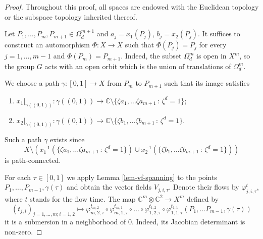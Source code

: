 \documentclass[a4paper,draft,reqno,12pt]{amsart}
\theoremstyle{definition}
\theoremstyle{remark}
\def\CC{{\mathbb C}}
\begin{document}
\begin{proof}
Throughout this proof, all spaces are endowed with the Euclidean topology or the subspace topology inherited thereof.

Let $P_1, \dots, P_m, P_{m+1} \in \Omega^{m+1}_d$ and $a_j = x_1(P_j)$, $b_j = x_2(P_j)$. It suffices to construct an automorphism $\Phi \colon X \to X$ such that $\Phi(P_j) = P_j$ for every 
$j =1, \dots, m-1$ and $\Phi(P_m) = P_{m+1}$. Indeed, the subset $\Omega^m_d$ is open in $X^m$, so the group $G$ acts with an open orbit which is the union of translations of $\Omega^m_d$. 

We choose a path $\gamma \colon [0,1] \to X$ from $P_m$ to $P_{m+1}$ such that its image satisfies
\begin{enumerate}
\item $x_1|_{\gamma((0,1))} \colon \gamma((0,1))\to \CC \setminus \{\zeta a_1, \dots \zeta a_{m+1} \,:\, \zeta^d = 1\}$;
\item $x_2|_{\gamma((0,1))} \colon \gamma((0,1))\to \CC \setminus \{\zeta b_1, \dots \zeta b_{m+1} \,:\, \zeta^d = 1\}$.
\end{enumerate}
Such a path $\gamma$ exists since
\[X \setminus \left( x_1^{-1}(\{\zeta a_1, \dots \zeta a_{m+1} \,:\, \zeta^d = 1\}) \cup x_2^{-1}(\{\zeta b_1, \dots \zeta b_{m+1} \,:\, \zeta^d = 1\}) \right)\]
is path-connected. 

For each $\tau \in [0,1]$ we apply Lemma \ref{lem-vf-spanning} to the points $P_1, \dots, P_{m-1}, \gamma(\tau)$ and obtain the vector fields $V_{j,i,\tau}$. Denote their flows by $\varphi_{j,i,\tau}^t$, where $t$ stands for the flow time. The map $\CC^m\otimes \CC^2 \to X^m$ defined by
\[
(t_{j,i})_{j=1, \dots, m; i=1,2} \mapsto \varphi_{m,2,\tau}^{t_{m,2}} \circ \varphi_{m,1,\tau}^{t_{m,1}} \circ \dots \circ \varphi_{1,2,\tau}^{t_{1,2}} \circ \varphi_{1,1,\tau}^{t_{1,1}}(P_1, \dots P_{m-1}, \gamma(\tau))
\]
it is a submersion in a neighborhood of $0$. Indeed, its Jacobian determinant is non-zero. 


\end{proof}
\end{document}

